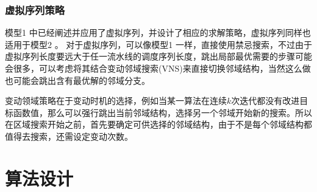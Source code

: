 \subsubsection{虚拟序列策略}
模型1 中已经阐述并应用了虚拟序列，并设计了相应的求解策略，虚拟序列同样也适用于模型2 。
对于虚拟序列，可以像模型1 一样，直接使用禁忌搜索，不过由于虚拟序列长度要远大于任一流水线的调度序列长度，跳出局部最优需要的步骤可能会很多，可以考虑将其结合变动邻域搜索(VNS)来直接切换邻域结构，当然这么做也可能会跳出含有最优解的邻域分支。

变动领域策略在于变动时机的选择，例如当某一算法在连续$k$次迭代都没有改进目标函数值，那么可以强行跳出当前邻域结构，选择另一个邻域开始新的搜索。所以在区域搜索开始之前，首先要确定可供选择的邻域结构，由于不是每个邻域结构都值得去搜索，还需设定变动次数。
\section{算法设计}
